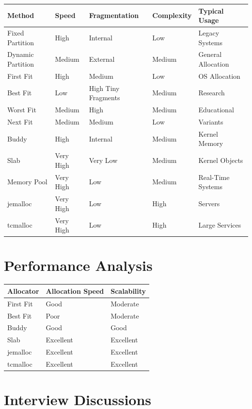 \begin{center}
\begin{tabular}{p{2.8cm}p{2.8cm}p{2.8cm}p{2.8cm}p{2.8cm}}
\toprule
Method & Speed & Fragmentation & Complexity & Typical Usage \\
\midrule
Fixed Partition & High & Internal & Low & Legacy Systems \\
Dynamic Partition & Medium & External & Medium & General Allocation \\
First Fit & High & Medium & Low & OS Allocation \\
Best Fit & Low & High Tiny Fragments & Medium & Research \\
Worst Fit & Medium & High & Medium & Educational \\
Next Fit & Medium & Medium & Low & Variants \\
Buddy & High & Internal & Medium & Kernel Memory \\
Slab & Very High & Very Low & Medium & Kernel Objects \\
Memory Pool & Very High & Low & Medium & Real-Time Systems \\
jemalloc & Very High & Low & High & Servers \\
tcmalloc & Very High & Low & High & Large Services \\
\bottomrule
\end{tabular}
\end{center}

\section{Performance Analysis}

\begin{center}
\begin{tabular}{lll}
\toprule
Allocator & Allocation Speed & Scalability \\
\midrule
First Fit & Good & Moderate \\
Best Fit & Poor & Moderate \\
Buddy & Good & Good \\
Slab & Excellent & Excellent \\
jemalloc & Excellent & Excellent \\
tcmalloc & Excellent & Excellent \\
\bottomrule
\end{tabular}
\end{center}

\section{Interview Discussions}


